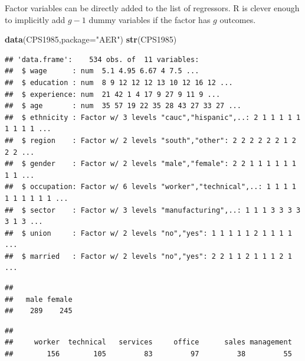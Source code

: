 \documentclass[]{book}
\newenvironment{Shaded}{\begin{snugshade}}{\end{snugshade}}
\newcommand{\CommentTok}[1]{\textcolor[rgb]{0.56,0.35,0.01}{\textit{#1}}}
\newcommand{\DataTypeTok}[1]{\textcolor[rgb]{0.13,0.29,0.53}{#1}}
\newcommand{\KeywordTok}[1]{\textcolor[rgb]{0.13,0.29,0.53}{\textbf{#1}}}
\newcommand{\NormalTok}[1]{#1}
\newcommand{\OperatorTok}[1]{\textcolor[rgb]{0.81,0.36,0.00}{\textbf{#1}}}
\newcommand{\StringTok}[1]{\textcolor[rgb]{0.31,0.60,0.02}{#1}}
\begin{document}
Factor variables can be directly added to the list of regressors. R is
clever enough to implicitly add \(g-1\) dummy variables if the factor
has \(g\) outcomes.

\begin{Shaded}
\begin{Highlighting}[]
\KeywordTok{data}\NormalTok{(CPS1985,}\DataTypeTok{package=}\StringTok{"AER"}\NormalTok{)}
\KeywordTok{str}\NormalTok{(CPS1985)}
\end{Highlighting}
\end{Shaded}

\begin{verbatim}
## 'data.frame':    534 obs. of  11 variables:
##  $ wage      : num  5.1 4.95 6.67 4 7.5 ...
##  $ education : num  8 9 12 12 12 13 10 12 16 12 ...
##  $ experience: num  21 42 1 4 17 9 27 9 11 9 ...
##  $ age       : num  35 57 19 22 35 28 43 27 33 27 ...
##  $ ethnicity : Factor w/ 3 levels "cauc","hispanic",..: 2 1 1 1 1 1 1 1 1 1 ...
##  $ region    : Factor w/ 2 levels "south","other": 2 2 2 2 2 2 1 2 2 2 ...
##  $ gender    : Factor w/ 2 levels "male","female": 2 2 1 1 1 1 1 1 1 1 ...
##  $ occupation: Factor w/ 6 levels "worker","technical",..: 1 1 1 1 1 1 1 1 1 1 ...
##  $ sector    : Factor w/ 3 levels "manufacturing",..: 1 1 1 3 3 3 3 3 1 3 ...
##  $ union     : Factor w/ 2 levels "no","yes": 1 1 1 1 1 2 1 1 1 1 ...
##  $ married   : Factor w/ 2 levels "no","yes": 2 2 1 1 2 1 1 1 2 1 ...
\end{verbatim}

\begin{Shaded}
\end{Shaded}

\begin{verbatim}
## 
##   male female 
##    289    245
\end{verbatim}

\begin{Shaded}
\end{Shaded}

\begin{verbatim}
## 
##     worker  technical   services     office      sales management 
##        156        105         83         97         38         55
\end{verbatim}
\end{document}
